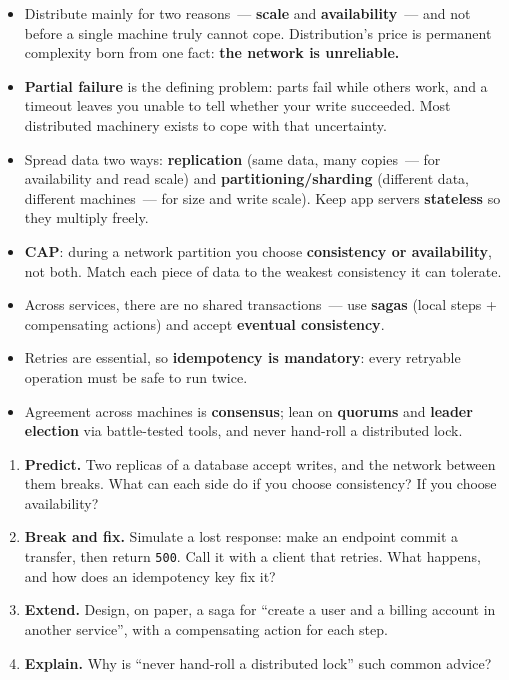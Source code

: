 \label{40-distributed-systems:key-takeaways}
\begin{takeaways}

\begin{itemize}
\tightlist
\item
  Distribute mainly for two reasons~--- \textbf{scale} and \textbf{availability}~--- and not before a single machine truly cannot cope. Distribution's price is permanent complexity born from one fact: \textbf{the network is unreliable.}
\item
  \textbf{Partial failure} is the defining problem: parts fail while others work, and a timeout leaves you unable to tell whether your write succeeded. Most distributed machinery exists to cope with that uncertainty.
\item
  Spread data two ways: \textbf{replication} (same data, many copies~--- for availability and read scale) and \textbf{partitioning/sharding} (different data, different machines~--- for size and write scale). Keep app servers \textbf{stateless} so they multiply freely.
\item
  \textbf{CAP}: during a network partition you choose \textbf{consistency or availability}, not both. Match each piece of data to the weakest consistency it can tolerate.
\item
  Across services, there are no shared transactions~--- use \textbf{sagas} (local steps + compensating actions) and accept \textbf{eventual consistency}.
\item
  Retries are essential, so \textbf{idempotency is mandatory}: every retryable operation must be safe to run twice.
\item
  Agreement across machines is \textbf{consensus}; lean on \textbf{quorums} and \textbf{leader election} via battle-tested tools, and never hand-roll a distributed lock.
\end{itemize}

\end{takeaways}

\label{40-distributed-systems:exercises}

\begin{enumerate}
\def\labelenumi{\arabic{enumi}.}
\tightlist
\item
  \textbf{Predict.} Two replicas of a database accept writes, and the network between them breaks. What can each side do if you choose consistency? If you choose availability?
\item
  \textbf{Break and fix.} Simulate a lost response: make an endpoint commit a transfer, then return \texttt{500}. Call it with a client that retries. What happens, and how does an idempotency key fix it?
\item
  \textbf{Extend.} Design, on paper, a saga for ``create a user and a billing account in another service'', with a compensating action for each step.
\item
  \textbf{Explain.} Why is ``never hand-roll a distributed lock'' such common advice?
\end{enumerate}

